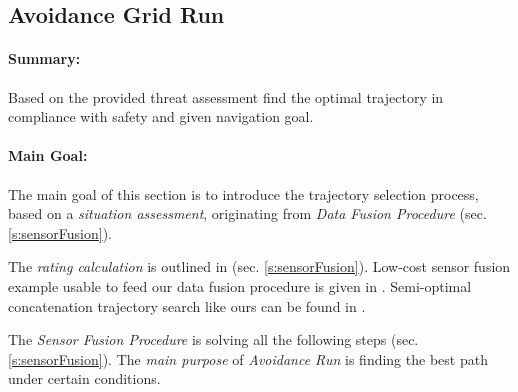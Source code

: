 \newpage
\subsection{Avoidance Grid Run}\label{s:aviudabceGridRun}

\paragraph{Summary:} Based on the provided threat assessment find the optimal trajectory in compliance with safety and given navigation goal.

\paragraph{Main Goal:} The main goal of this section is to introduce the trajectory selection process, based on a \emph{situation assessment}, originating from \emph{Data Fusion Procedure} (sec. \ref{s:sensorFusion}). 

\begin{note}
    The \emph{rating calculation} is outlined in (sec. \ref{s:sensorFusion}). Low-cost sensor fusion example usable to feed our data fusion procedure is given in \cite{sabatini2013low}. Semi-optimal concatenation trajectory search  like ours can be found in \cite{shaw1998using}.
\end{note}

\begin{note}
    The \emph{Sensor Fusion Procedure} is solving all the following steps (sec. \ref{s:sensorFusion}). The \emph{main purpose} of \emph{Avoidance Run} is finding the best path under certain conditions.
\end{note}

